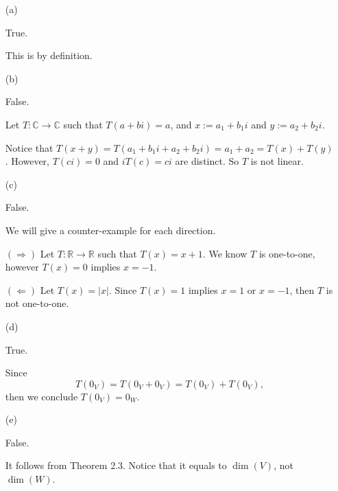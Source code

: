 \begin{Exercise}
\begin{enumerate}[(a)]
\item[(a)]
\begin{answer}
True.
\end{answer}
\begin{solution}
This is by definition.
\end{solution}

\item[(b)]
\begin{answer}
False.
\end{answer}
\begin{solution}
Let $T:\mathbb{C}\to\mathbb{C}$ such that $T(a+b i) = a$, and $x := a_1 + b_1 i$ and $y := a_2 + b_2 i$.

Notice that $T(x+y) = T(a_1 + b_1 i + a_2 + b_2 i) = a_1 + a_2 = T(x) + T(y)$. However, $T(c i) = 0$ and $i T(c) = c i$ are distinct. So $T$ is not linear.
\end{solution}

\item[(c)]
\begin{answer}
False.
\end{answer}
\begin{solution}
We will give a counter-example for each direction.

$(\Longrightarrow)$
Let $T:\mathbb{R}\to\mathbb{R}$ such that $T(x) = x+1$. We know $T$ is one-to-one, however $T(x) = 0$ implies $x=-1$.

\vspace{2ex}

$(\Longleftarrow)$
Let $T(x) = |x|$. Since $T(x) = 1$ implies $x = 1$ or $x=-1$, then $T$ is not one-to-one.
\end{solution}

\item[(d)]
\begin{answer}
True.
\end{answer}
\begin{solution}
Since
$$
T(0_V) = T(0_V+0_V) = T(0_V) + T(0_V),
$$
then we conclude $T(0_V) = 0_W$.
\end{solution}

\item[(e)]
\begin{answer}
False.
\end{answer}
\begin{solution}
It follows from Theorem 2.3. Notice that it equals to $\dim(V)$, not $\dim(W)$.
\end{solution}


\end{enumerate}
\end{Exercise}
